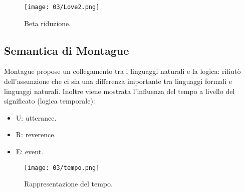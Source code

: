 \begin{figure}[!h]
    \centering
    \texttt{[image: 03/Love2.png]}
    \caption{Beta riduzione.}
\end{figure}

\subsection{Semantica di Montague}

Montague propose un collegamento tra i linguaggi naturali e la logica: rifiutò dell'assunzione che ci sia una differenza importante tra linguaggi formali e linguaggi naturali. Inoltre viene mostrata l'influenza del tempo a livello del significato (logica temporale):

\begin{itemize}
  \item U: utterance. 
  \item R: reverence. 
  \item E: event.
\end{itemize}


\begin{figure}[!h]
    \centering
    \texttt{[image: 03/tempo.png]}
    \caption{Rappresentazione del tempo.}
\end{figure}





